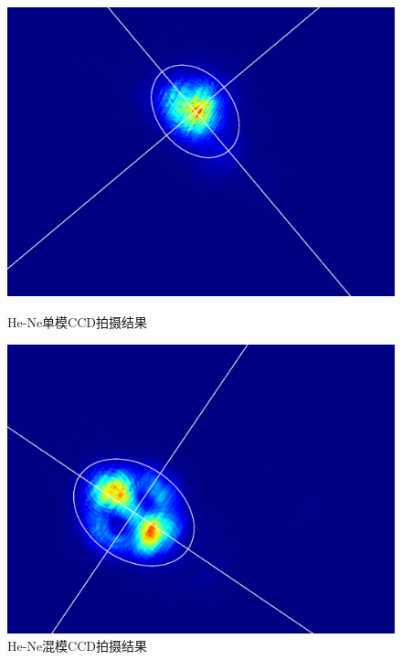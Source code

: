 \begin{figure}[H]
	\begin{minipage}{0.3\textwidth}
		\centering
		\includegraphics[width=\textwidth]{images/APL1_8_exp2_1_ccd}
		\caption{He-Ne单模CCD拍摄结果}
		\label{fig:apl18exp21ccd}
	\end{minipage}
	\begin{minipage}{0.3\textwidth}
		\centering
		\includegraphics[width=\textwidth]{images/APL1_8_exp2_2_ccd}
		\caption{He-Ne混模CCD拍摄结果}
		\label{fig:apl18exp22ccd}
	\end{minipage}
	\begin{minipage}{0.3\textwidth}
		\centering

\end{minipage}
\end{figure}
